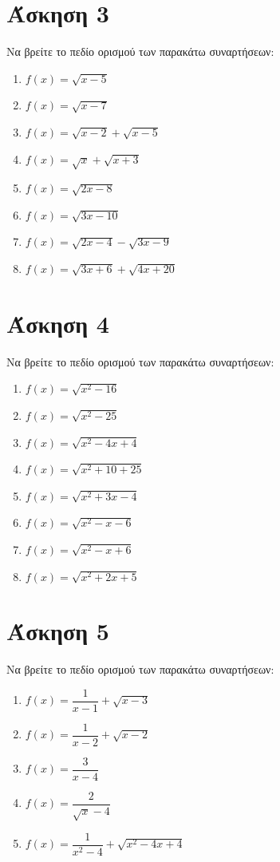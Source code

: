 \documentclass[a4paper,10pt]{report}
\begin{document}
\section*{Άσκηση 3  \hfill \small{}}
Να βρείτε το πεδίο ορισμού των παρακάτω συναρτήσεων:
\begin{enumerate}[1)]
 \item $f(x)=\sqrt{x-5}$
 \item $f(x)=\sqrt{x-7}$
 \item $f(x)=\sqrt{x-2}+\sqrt{x-5}$
 \item $f(x)=\sqrt{x}+\sqrt{x+3}$
 \item $f(x)=\sqrt{2x-8}$
 \item $f(x)=\sqrt{3x-10}$
 \item $f(x)=\sqrt{2x-4}-\sqrt{3x-9}$
 \item $f(x)=\sqrt{3x+6}+\sqrt{4x+20}$
\end{enumerate}


\section*{Άσκηση 4  \hfill \small{}}
Να βρείτε το πεδίο ορισμού των παρακάτω συναρτήσεων:
\begin{enumerate}[1)]
 \item $f(x)=\sqrt{x^{2}-16}$
 \item $f(x)=\sqrt{x^{2}-25}$ 
 \item $f(x)=\sqrt{x^{2}-4x+4}$ 
 \item $f(x)=\sqrt{x^{2}+10+25}$
 \item $f(x)=\sqrt{x^{2}+3x-4}$
 \item $f(x)=\sqrt{x^{2}-x-6}$
 \item $f(x)=\sqrt{x^{2}-x+6}$
 \item $f(x)=\sqrt{x^{2}+2x+5}$
\end{enumerate}



\section*{Άσκηση 5  \hfill \small{}}
Να βρείτε το πεδίο ορισμού των παρακάτω συναρτήσεων:
\begin{enumerate}[1)]
 \item $f(x)=\dfrac{1}{x-1}+\sqrt{x-3}$
 \item $f(x)=\dfrac{1}{x-2}+\sqrt{x-2}$
 \item $f(x)=\dfrac{3}{x-4}$
 \item $f(x)=\dfrac{2}{\sqrt{x}-4}$
 \item $f(x)=\dfrac{1}{x^{2}-4}+\sqrt{x^{2}-4x+4}$
\end{enumerate}
\end{document}
